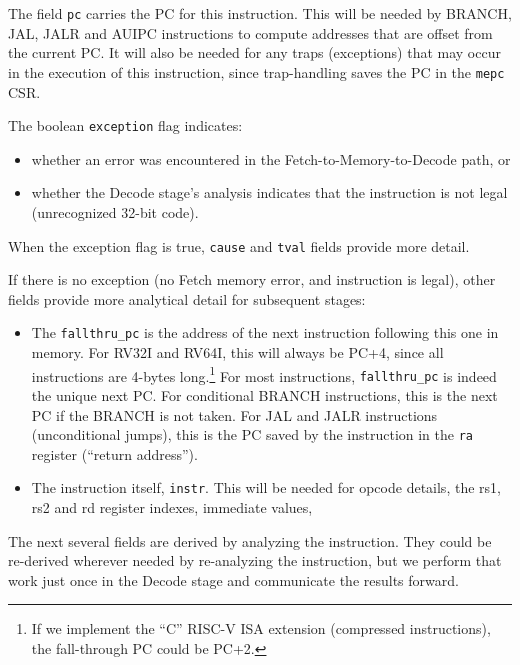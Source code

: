 
The field {\tt pc} carries the PC for this instruction.  This will be
needed by BRANCH, JAL, JALR and AUIPC instructions to compute
addresses that are offset from the current PC.  It will also be needed
for any traps (exceptions) that may occur in the execution of this
instruction, since trap-handling saves the PC in the {\tt mepc} CSR.

The boolean \verb|exception| flag indicates:

\begin{itemize}

 \item whether an error was encountered in the Fetch-to-Memory-to-Decode path, or

 \item whether the Decode stage's analysis indicates that the
       instruction is not legal (unrecognized 32-bit code).

\end{itemize}

When the exception flag is true, \verb|cause| and \verb|tval| fields
provide more detail.

If there is no exception (no Fetch memory error, and instruction is
legal), other fields provide more analytical detail for subsequent
stages:

\begin{itemize}

\item The {\tt fallthru\_pc} is the address of the next instruction
      following this one in memory.  For RV32I and RV64I, this will
      always be PC+4, since all instructions are 4-bytes
      long.\footnote{If we implement the ``C'' RISC-V ISA extension
      (compressed instructions), the fall-through PC could be PC+2.}
      For most instructions, {\tt fallthru\_pc} is indeed the unique
      next PC.  For conditional BRANCH instructions, this is the next
      PC if the BRANCH is not taken.  For JAL and JALR instructions
      (unconditional jumps), this is the PC saved by the instruction
      in the {\tt ra} register (``return address'').

\item The instruction itself, {\tt instr}.  This will be needed for
      opcode details, the rs1, rs2 and rd register indexes, immediate
      values, {\etc}

\end{itemize}

The next several fields are derived by analyzing the instruction.
They could be re-derived wherever needed by re-analyzing the
instruction, but we perform that work just once in the Decode stage
and communicate the results forward.

